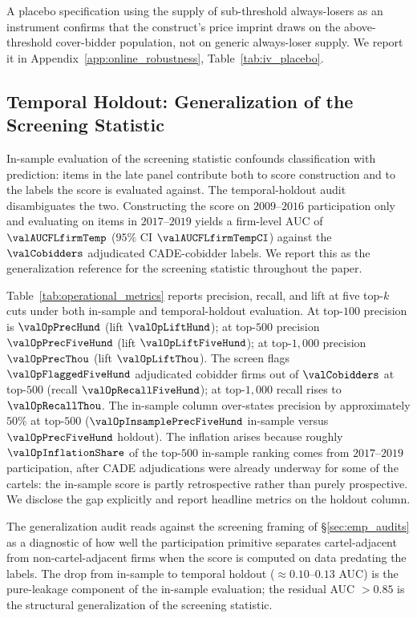 A placebo specification using the supply of sub-threshold
always-losers as an instrument confirms that the construct's
price imprint draws on the above-threshold cover-bidder
population, not on generic always-loser supply. We report it in
Appendix~\ref{app:online_robustness}, Table~\ref{tab:iv_placebo}.

\subsection{Temporal Holdout: Generalization of the Screening
Statistic}
\label{sec:rob_operational}

In-sample evaluation of the screening statistic confounds
classification with prediction: items in the late panel
contribute both to score construction and to the labels the
score is evaluated against. The temporal-holdout audit
disambiguates the two. Constructing the score on
$2009$--$2016$ participation only and evaluating on items in
$2017$--$2019$ yields a firm-level AUC of $\valAUCFLfirmTemp$
($95\%$ CI $\valAUCFLfirmTempCI$) against the $\valCobidders$
adjudicated CADE-cobidder labels. We report this as the
generalization reference for the screening statistic throughout
the paper.

Table~\ref{tab:operational_metrics} reports precision, recall,
and lift at five top-$k$ cuts under both in-sample and
temporal-holdout evaluation. At top-$100$ precision is
$\valOpPrecHund$ (lift $\valOpLiftHund$); at top-$500$
precision $\valOpPrecFiveHund$ (lift $\valOpLiftFiveHund$); at
top-$1{,}000$ precision $\valOpPrecThou$ (lift $\valOpLiftThou$).
The screen flags $\valOpFlaggedFiveHund$ adjudicated cobidder
firms out of $\valCobidders$ at top-$500$ (recall
$\valOpRecallFiveHund$); at top-$1{,}000$ recall rises to
$\valOpRecallThou$. The in-sample column over-states precision
by approximately $50\%$ at top-$500$
($\valOpInsamplePrecFiveHund$ in-sample versus
$\valOpPrecFiveHund$ holdout). The inflation arises because
roughly $\valOpInflationShare$ of the top-$500$ in-sample
ranking comes
from $2017$--$2019$ participation, after CADE adjudications were
already underway for some of the cartels: the in-sample score is
partly retrospective rather than purely prospective. We disclose
the gap explicitly and report headline metrics on the holdout
column.

The generalization audit reads against the screening framing of
\S\ref{sec:emp_audits} as a diagnostic of how well the
participation primitive separates cartel-adjacent from
non-cartel-adjacent firms when the score is computed on data
predating the labels. The drop from in-sample to temporal
holdout ($\approx 0.10$--$0.13$ AUC) is the pure-leakage component of
the in-sample evaluation; the residual AUC $>0.85$ is the
structural generalization of the screening statistic.

